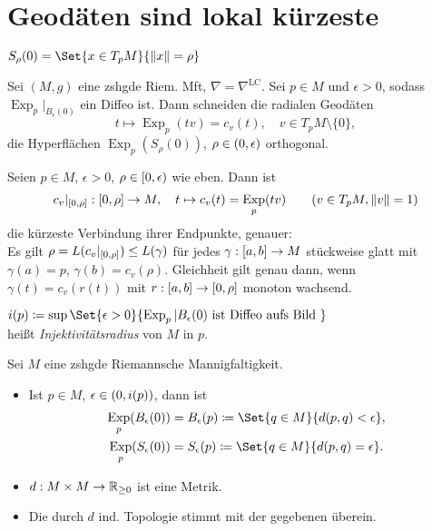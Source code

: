 \documentclass{cheat-sheet}
\DeclareMathOperator{\Exp}{Exp} %
\newcommand{\abinterval}{\cinterval{a}{b}} %
\newcommand{\LC}{\nabla^{\mathrm{LC}}} %
\begin{document}
\section{Geodäten sind lokal kürzeste}

\begin{nota}
  $S_\rho(0) = \Set{ x \in T_p M }{ \norm{x} = \rho }$
\end{nota}

\begin{satz} %
  Sei $(M, g)$ eine zshgde Riem. Mft, $\nabla = \LC$.
  Sei $p \in M$ und $\epsilon > 0$, sodass $\Exp_p|_{B_{\epsilon}(0)}$ ein Diffeo ist.
  Dann schneiden die radialen Geodäten
  \[ t \mapsto \Exp_p(tv) = c_v(t), \quad v \in T_p M \setminus \{ 0 \},  \]
  die Hyperflächen $\Exp_p(S_\rho(0))$, $\rho \in \left( 0, \epsilon \right)$ orthogonal.
\end{satz}

\begin{satz}
  Seien $p \in M$, $\epsilon > 0$, $\rho \in \left[ 0, \epsilon \right)$ wie eben. Dann ist
  \[
    c_v|_{\cinterval{0}{\rho}} : \cinterval{0}{\rho} \to M, \quad
    t \mapsto c_v(t) = \Exp_p(t v) \qquad
    (v \in T_p M, \norm{v} = 1)
  \]
  die kürzeste Verbindung ihrer Endpunkte, genauer: \\
  Es gilt $\rho = L(c_v|_{\left[ 0, \rho \right]}) \leq L(\gamma)$ für jedes $\gamma : \abinterval \to M$ stückweise glatt mit $\gamma(a) = p$, $\gamma(b) = c_v(\rho)$.
  Gleichheit gilt genau dann, wenn $\gamma(t) = c_v(r(t))$ mit $r : \abinterval \to \cinterval{0}{\rho}$ monoton wachsend.
\end{satz}


\begin{defn}
  \begin{minipage}[t]{0.8 \linewidth}
    $i(p) \coloneqq \sup \Set{ \epsilon > 0 }{ \Exp_p|B_{\epsilon}(0) \text{ ist Diffeo aufs Bild } }$ \\
    heißt \textit{Injektivitätsradius} von $M$ in $p$.
  \end{minipage}
\end{defn}

\begin{satz}
  Sei $M$ eine zshgde Riemannsche Mannigfaltigkeit.
  \begin{itemize}
    \item Ist $p \in M$, $\epsilon \in \left( 0, i(p) \right)$, dann ist
    \begin{align*}
      \Exp_p(B_\epsilon(0)) & = B_\epsilon(p) \coloneqq \Set{q \in M}{d(p, q) < \epsilon},\\
      \Exp_p(S_\epsilon(0)) & = S_\epsilon(p) \coloneqq \Set{q \in M}{d(p, q) = \epsilon}.
    \end{align*}
    \item $d : M \times M \to \mathbb{R}_{\geq 0}$ ist eine Metrik.
    \item Die durch $d$ ind. Topologie stimmt mit der gegebenen überein.
  \end{itemize}
\end{satz}
\end{document}

